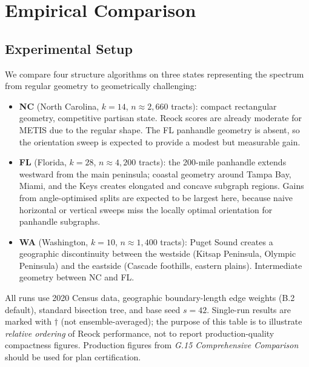 \section{Empirical Comparison}
\label{sec:comparison}

\subsection{Experimental Setup}

We compare four structure algorithms on three states representing the spectrum
from regular geometry to geometrically challenging:

\begin{itemize}
\item \textbf{NC} (North Carolina, $k=14$, $n \approx 2{,}660$ tracts):
  compact rectangular geometry, competitive partisan state.
  Reock scores are already moderate for METIS due to the regular shape.
  The FL panhandle geometry is absent, so the orientation sweep is expected
  to provide a modest but measurable gain.

\item \textbf{FL} (Florida, $k=28$, $n \approx 4{,}200$ tracts):
  the 200-mile panhandle extends westward from the main peninsula;
  coastal geometry around Tampa Bay, Miami, and the Keys creates elongated
  and concave subgraph regions.
  Gains from angle-optimised splits are expected to be largest here,
  because naive horizontal or vertical sweeps miss the locally optimal
  orientation for panhandle subgraphs.

\item \textbf{WA} (Washington, $k=10$, $n \approx 1{,}400$ tracts):
  Puget Sound creates a geographic discontinuity between the westside
  (Kitsap Peninsula, Olympic Peninsula) and the eastside (Cascade foothills,
  eastern plains).
  Intermediate geometry between NC and FL.
\end{itemize}

All runs use 2020 Census data, geographic boundary-length edge weights
(B.2 default), standard bisection tree, and base seed $s = 42$.
Single-run results are marked with $\dagger$ (not ensemble-averaged); the
purpose of this table is to illustrate \emph{relative ordering} of Reock
performance, not to report production-quality compactness figures.
Production figures from \textit{G.15 Comprehensive Comparison}~\citep{dellaLibera2026comparison}
should be used for plan certification.

